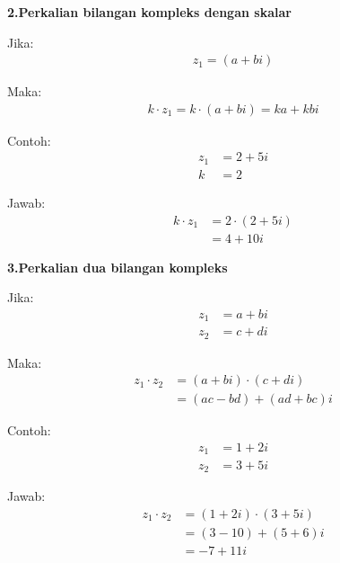 \documentclass{article}
\begin{document}
    \textbf{2.\>Perkalian bilangan kompleks dengan skalar\\}
    
    Jika:
    \begin{align}
        z_1 = (a + bi) \nonumber
    \end{align}

    Maka:
    \begin{align}
        k \cdot z_1 = k \cdot (a + bi) = ka + kbi \nonumber
    \end{align}

    Contoh:
    \begin{align}
        z_1 &= 2 + 5i
        \nonumber\\
        k   &= 2
        \nonumber
    \end{align}
    
    Jawab:
    \begin{align}
        k \cdot z_1 &= 2 \cdot (2 + 5i)
                    \nonumber\\
                    &= 4 + 10i
                    \nonumber
    \end{align}
    \leavevmode
    \newpage

    \textbf{3.\>Perkalian dua bilangan kompleks\\}
    
    Jika:
    \begin{align}
        z_1 &= a + bi
        \nonumber\\
        z_2 &= c + di
        \nonumber
    \end{align}
    
    Maka:
    \begin{align}
        z_1 \cdot z_2   &= (a + bi)\cdot(c + di)
                        \nonumber\\
                        &= (ac - bd) + (ad + bc)i
                        \nonumber
    \end{align}
    
    Contoh:
    \begin{align}
        z_1 &= 1 + 2i
        \nonumber\\
        z_2 &= 3 + 5i
        \nonumber
    \end{align}
    
    Jawab:
    \begin{align}
        z_1 \cdot z_2   &= (1 + 2i) \cdot (3 + 5i)
                        \nonumber\\
                        &= (3 - 10) + (5 + 6)i
                        \nonumber\\
                        &= -7 + 11i
                        \nonumber
    \end{align}
\end{document}
